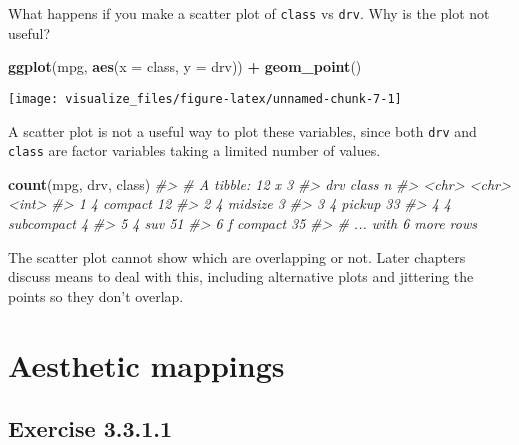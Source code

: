 \documentclass[]{book}
\newenvironment{Shaded}{\begin{snugshade}}{\end{snugshade}}
\newcommand{\CommentTok}[1]{\textcolor[rgb]{0.56,0.35,0.01}{\textit{#1}}}
\newcommand{\DataTypeTok}[1]{\textcolor[rgb]{0.13,0.29,0.53}{#1}}
\newcommand{\KeywordTok}[1]{\textcolor[rgb]{0.13,0.29,0.53}{\textbf{#1}}}
\newcommand{\NormalTok}[1]{#1}
\newcommand{\OperatorTok}[1]{\textcolor[rgb]{0.81,0.36,0.00}{\textbf{#1}}}
\newcommand{\StringTok}[1]{\textcolor[rgb]{0.31,0.60,0.02}{#1}}
\theoremstyle{plain}
\theoremstyle{remark}
\begin{document}
What happens if you make a scatter plot of \texttt{class} vs
\texttt{drv}. Why is the plot not useful?

\begin{Shaded}
\begin{Highlighting}[]
\KeywordTok{ggplot}\NormalTok{(mpg, }\KeywordTok{aes}\NormalTok{(}\DataTypeTok{x =}\NormalTok{ class, }\DataTypeTok{y =}\NormalTok{ drv)) }\OperatorTok{+}
\StringTok{  }\KeywordTok{geom_point}\NormalTok{()}
\end{Highlighting}
\end{Shaded}

\begin{center}\texttt{[image: visualize\_files/figure-latex/unnamed-chunk-7-1]} \end{center}

A scatter plot is not a useful way to plot these variables, since both
\texttt{drv} and \texttt{class} are factor variables taking a limited
number of values.

\begin{Shaded}
\begin{Highlighting}[]
\KeywordTok{count}\NormalTok{(mpg, drv, class)}
\CommentTok{#> # A tibble: 12 x 3}
\CommentTok{#>   drv   class          n}
\CommentTok{#>   <chr> <chr>      <int>}
\CommentTok{#> 1 4     compact       12}
\CommentTok{#> 2 4     midsize        3}
\CommentTok{#> 3 4     pickup        33}
\CommentTok{#> 4 4     subcompact     4}
\CommentTok{#> 5 4     suv           51}
\CommentTok{#> 6 f     compact       35}
\CommentTok{#> # ... with 6 more rows}
\end{Highlighting}
\end{Shaded}

The scatter plot cannot show which are overlapping or not. Later
chapters discuss means to deal with this, including alternative plots
and jittering the points so they don't overlap.

\hypertarget{aesthetic-mappings}{%
\section{Aesthetic mappings}\label{aesthetic-mappings}}

\hypertarget{exercise-3.3.1.1}{%
\subsection*{\texorpdfstring{Exercise
{3.3.1.1}}{Exercise 3.3.1.1}}\label{exercise-3.3.1.1}}
\end{document}
